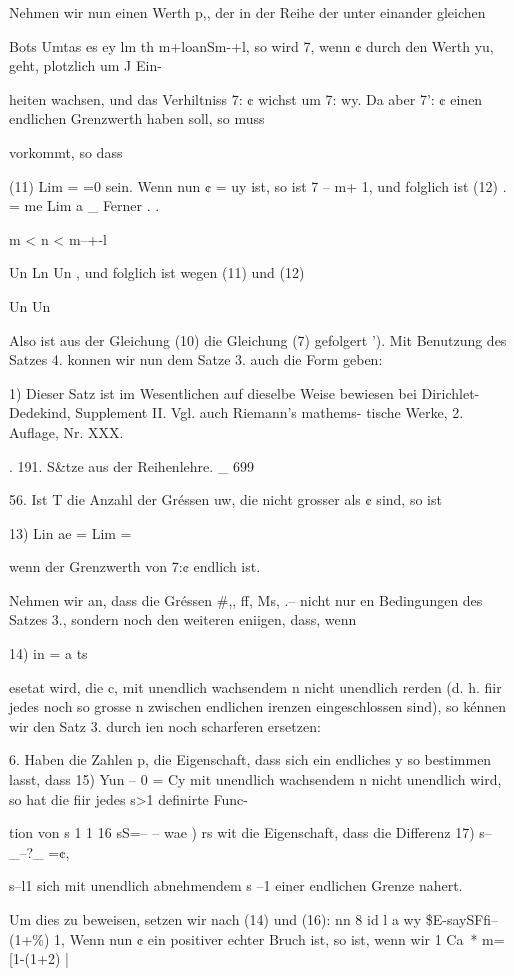 \documentclass[12pt,a4paper]{article}
\theoremstyle{plain}
\theoremstyle{definition}
\begin{document}
Nehmen wir nun einen Werth p,, der in der Reihe der unter einander gleichen

Bots Umtas es ey lm th m+loanSm-+l, so wird 7, wenn ¢ durch den Werth yu, geht, plotzlich um J Ein-

heiten wachsen, und das Verhiltniss 7: ¢ wichst um 7: wy. Da aber 7': ¢ einen endlichen Grenzwerth haben soll, so muss

vorkommt, so dass

(11) Lim = =0 sein. Wenn nun ¢ = uy ist, so ist 7 -- m+ 1, und folglich ist (12) . = me Lim a \_ Ferner . .

m < n < m--+-l

Un Ln Un , und folglich ist wegen (11) und (12)

Un Un

Also ist aus der Gleichung (10) die Gleichung (7) gefolgert '). Mit Benutzung des Satzes 4. konnen wir nun dem Satze 3. auch die Form geben:

1) Dieser Satz ist im Wesentlichen auf dieselbe Weise bewiesen bei Dirichlet-Dedekind, Supplement II. Vgl. auch Riemann's mathems- tische Werke, 2. Auflage, Nr. XXX.

. 191. S\&tze aus der Reihenlehre. \_ 699

56. Ist T die Anzahl der Gréssen uw, die nicht grosser als ¢ sind, so ist

13) Lin ae = Lim =

wenn der Grenzwerth von 7:¢ endlich ist.

Nehmen wir an, dass die Gréssen \#,, ff, Ms, .-- nicht nur en Bedingungen des Satzes 3., sondern noch den weiteren eniigen, dass, wenn

14) in = a ts

esetat wird, die c, mit unendlich wachsendem n nicht unendlich rerden (d. h. fiir jedes noch so grosse n zwischen endlichen irenzen eingeschlossen sind), so kénnen wir den Satz 3. durch ien noch scharferen ersetzen:

6. Haben die Zahlen p, die Eigenschaft, dass sich ein endliches y so bestimmen lasst, dass 15) Yun -- 0 = Cy mit unendlich wachsendem n nicht unendlich wird, so hat die fiir jedes s>1 definirte Func-

tion von s 1 1 16 sS=-- -- wae ) rs wit die Eigenschaft, dass die Differenz 17) s--\_--?\_ =¢,

s--l1 sich mit unendlich abnehmendem s --1 einer endlichen Grenze nahert.

Um dies zu beweisen, setzen wir nach (14) und (16): nn 8 id l a wy \$E-saySFfi--(1+\%) 1, Wenn nun ¢ ein positiver echter Bruch ist, so ist, wenn wir 1 Ca~* m= [1-(1+2) |
\end{document}
